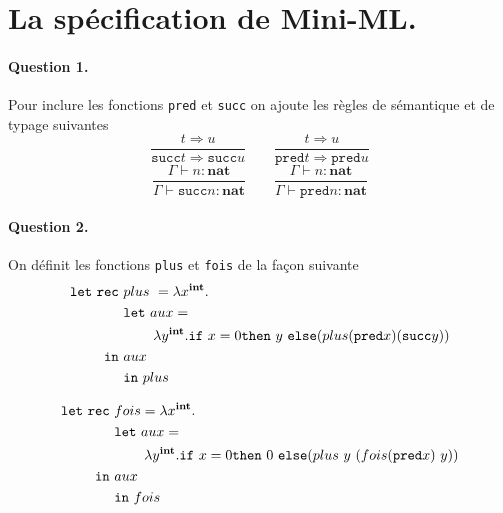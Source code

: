 \documentclass{article}
\title{\titre}
\date{}
\author{\auteur}
\newcommand{\titreCourt}{DM -- Mini-ML}
\newcommand{\auteur}{Marius \textsc{Dufraisse}}
\newcommand{\sem}{\Rightarrow}
\theoremstyle{thm}
\theoremstyle{def}
\theoremstyle{dem}
\newcommand{\code}[1]{\texttt{#1}}
\newcommand{\codem}[1]{\mathtt{#1}}
\newcommand{\types}[1]{\mathbf{#1}}
\begin{document}
	\renewcommand{\labelitemi}{\textbullet}



	\maketitle
	\section{La spécification de Mini-ML.}

	\paragraph{Question 1.}
	Pour inclure les fonctions \code{pred} et \code{succ} on ajoute les règles de sémantique et de typage suivantes
	\[ \frac{t \sem u}{\codem{succ}t\sem\codem{succ}{u}}\qquad \frac{t \sem u}{\codem{pred}t\sem\codem{pred}{u}} \]
	\[\frac{\Gamma\vdash  n : \types{nat}}{\Gamma\vdash \codem{succ}n:\types{nat}} \qquad\frac{\Gamma\vdash  n : \types{nat}}{\Gamma\vdash \codem{pred}n:\types{nat}}\]

	\paragraph{Question 2.}
	On définit les fonctions \code{plus} et \code{fois} de la façon suivante
	\begin{align*}
		\codem{let\ rec}\ &plus\ = \lambda x^{\types{int}} .\\
		&\codem{let}\ aux = \\
		&\hspace{0.75cm}\lambda y^{\types{int}}.\codem{if\ }x=0\codem{then}\ y\ \codem{else}(plus(\codem{pred}x)(\codem{succ}y))\\
		\codem{in}\ &aux\\
		&\codem{in\ }plus
	\end{align*}

	\begin{align*}
		\codem{let\ rec}\ &fois=\lambda x^{\types{int}} .\\
		&\codem{let}\ aux = \\
		&\hspace{0.75cm}\lambda y^{\types{int}}.\codem{if\ }x=0\codem{then}\ 0\ \codem{else}(plus\ y\ (fois(\codem{pred}x)\ y))\\
		\codem{in}\ &aux\\
		&\codem{in\ }fois
	\end{align*}
\end{document}
